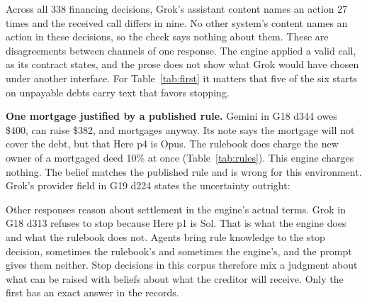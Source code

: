 Across all 338 financing decisions, Grok's assistant content names an action 27 times and the received call differs in nine. No other system's content names an action in these decisions, so the check says nothing about them. These are disagreements between channels of one response. The engine applied a valid call, as its contract states, and the prose does not show what Grok would have chosen under another interface. For Table~\ref{tab:first} it matters that five of the six starts on unpayable debts carry text that favors stopping.

\textbf{One mortgage justified by a published rule.} Gemini in G18 d344 owes \$400, can raise \$382, and mortgages anyway. Its note says the mortgage will not cover the debt, but that  Here p4 is Opus. The rulebook does charge the new owner of a mortgaged deed 10\% at once (Table~\ref{tab:rules}). This engine charges nothing. The belief matches the published rule and is wrong for this environment. Grok's provider field in G19 d224 states the uncertainty outright: 

Other responses reason about settlement in the engine's actual terms. Grok in G18 d313 refuses to stop because  Here p1 is Sol. That is what the engine does and what the rulebook does not. Agents bring rule knowledge to the stop decision, sometimes the rulebook's and sometimes the engine's, and the prompt gives them neither. Stop decisions in this corpus therefore mix a judgment about what can be raised with beliefs about what the creditor will receive. Only the first has an exact answer in the records.
